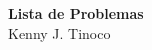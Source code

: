 \begin{center}
{
    \textbf{\Large Lista de Problemas} \vspace{5mm} \\
    {\large Kenny J. Tinoco} \vspace{3mm}
}
\end{center}
